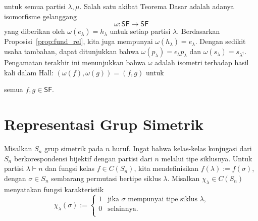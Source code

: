 \documentclass[12pt]{article}
\theoremstyle{plain}
\theoremstyle{definition}
\theoremstyle{remark}
\numberwithin{equation}{section}
\begin{document}
untuk semua partisi $\lambda, \mu$.
Salah satu akibat Teorema Dasar adalah adanya isomorfisme
gelanggang
\[
\omega : \mathsf{SF} \to \mathsf{SF}
\]
yang diberikan oleh $\omega(e_\lambda)=h_\lambda$ untuk setiap partisi $\lambda$.
Berdasarkan Proposisi~\ref{prop:fund_rel}, kita juga mempunyai
$\omega(h_\lambda)=e_\lambda$.
Dengan sedikit usaha tambahan, dapat ditunjukkan bahwa
$\omega(p_\lambda)=\epsilon_\lambda p_\lambda$
dan
$\omega(s_\lambda)=s_{\lambda^\dag}$.
Pengamatan terakhir ini menunjukkan bahwa $\omega$ adalah isometri
terhadap hasil kali dalam Hall:
$( \omega(f), \omega(g) ) = (f, g)$ untuk

semua $f,g \in \mathsf{SF}$.

\section{Representasi Grup Simetrik}
Misalkan $S_n$ grup simetrik pada $n$ huruf.
Ingat bahwa kelas-kelas konjugasi dari $S_n$ berkorespondensi bijektif dengan
partisi dari $n$ melalui tipe siklusnya.
Untuk partisi $\lambda \vdash n$ dan fungsi kelas
$f \in C(S_n)$, kita mendefinisikan $f(\lambda):=f(\sigma)$, dengan
$\sigma \in S_n$ sembarang permutasi bertipe siklus $\lambda$.
Misalkan $\chi_\lambda \in C(S_n)$ menyatakan fungsi karakteristik
\[
\chi_\lambda(\sigma) :=
\begin{cases}
1 & \textrm{jika $\sigma$ mempunyai tipe siklus $\lambda$,}\\
0 & \textrm{selainnya.}\\
\end{cases}
\]
\end{document}
